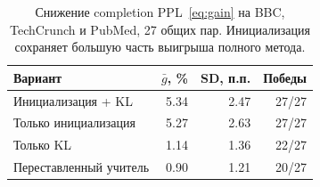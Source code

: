 \begin{table}[H]
\centering
\small
\caption{Снижение completion PPL~\eqref{eq:gain} на BBC, TechCrunch и PubMed, 27 общих пар. Инициализация сохраняет большую часть выигрыша полного метода.}
\label{tab:ablation}
\begin{tabular}{lrrr}
\toprule
Вариант & $\bar g$, \% & SD, п.п. & Победы \\
\midrule
Инициализация + KL & 5.34 & 2.47 & 27/27 \\
Только инициализация & 5.27 & 2.63 & 27/27 \\
Только KL & 1.14 & 1.36 & 22/27 \\
Переставленный учитель & 0.90 & 1.21 & 20/27 \\
\bottomrule
\end{tabular}
\end{table}
